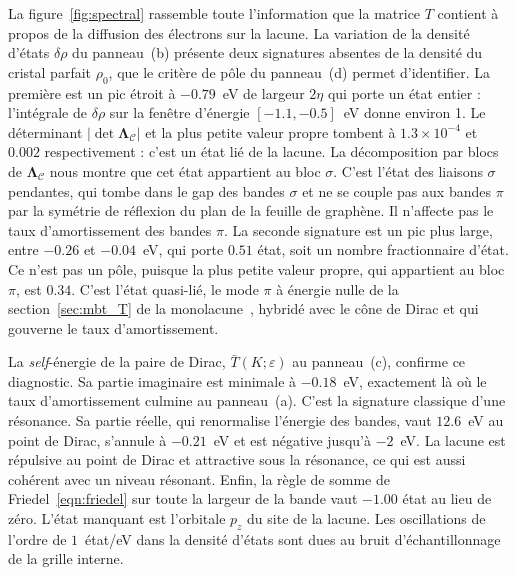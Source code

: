 La figure~\ref{fig:spectral} rassemble toute l'information que la matrice $T$ contient à propos de la diffusion des électrons sur la lacune. La variation de la densité d'états $\delta\rho$ du panneau~(b) présente deux signatures absentes de la densité du cristal parfait $\rho_0$, que le critère de pôle du panneau~(d) permet d'identifier. La première est un pic étroit à $-0.79$~eV de largeur $2\eta$ qui porte un état entier : l'intégrale de $\delta\rho$ sur la fenêtre d'énergie $[-1.1, -0.5]$~eV donne environ 1. Le déterminant $|\det \bm\Lambda_\mathcal{C}|$ et la plus petite valeur propre tombent à $1.3\times 10^{-4}$ et $0.002$ respectivement : c'est un état lié de la lacune. La décomposition par blocs de $\bm\Lambda_\mathcal{C}$ nous montre que cet état appartient au bloc $\sigma$. C'est l'état des liaisons $\sigma$ pendantes, qui tombe dans le gap des bandes $\sigma$ et ne se couple pas aux bandes $\pi$ par la symétrie de réflexion du plan de la feuille de graphène. Il n'affecte pas le taux d'amortissement des bandes $\pi$. La seconde signature est un pic plus large, entre $-0.26$ et $-0.04$~eV, qui porte $0.51$ état, soit un nombre fractionnaire d'état. Ce n'est pas un pôle, puisque la plus petite valeur propre, qui appartient au bloc $\pi$, est $0.34$. C'est l'état quasi-lié, le mode $\pi$ à énergie nulle de la section~\ref{sec:mbt_T} de la monolacune~\cite{pereiraDisorderInducedLocalized2006}, hybridé avec le cône de Dirac et qui gouverne le taux d'amortissement.

La \textit{self}-énergie de la paire de Dirac, $\bar T(K;\varepsilon)$ au panneau~(c), confirme ce diagnostic. Sa partie imaginaire est minimale à $-0.18$~eV, exactement là où le taux d'amortissement culmine au panneau~(a). C'est la signature classique d'une résonance. Sa partie réelle, qui renormalise l'énergie des bandes, vaut $12.6$~eV au point de Dirac, s'annule à $-0.21$~eV et est négative jusqu'à $-2$~eV. La lacune est répulsive au point de Dirac et attractive sous la résonance, ce qui est aussi cohérent avec un niveau résonant. Enfin, la règle de somme de Friedel~\eqref{eqn:friedel} sur toute la largeur de la bande vaut $-1.00$ état au lieu de zéro. L'état manquant est l'orbitale $p_z$ du site de la lacune. Les oscillations de l'ordre de $1$~état/eV dans la densité d'états sont dues au bruit d'échantillonnage de la grille interne.

\bigskip
{}

